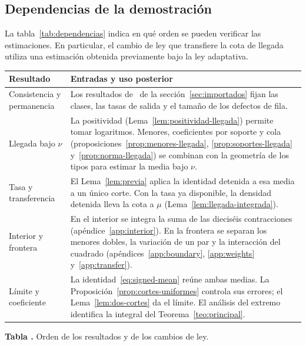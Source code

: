 \subsection{Dependencias de la demostración}\label{sec:dependencias}
La tabla~\ref{tab:dependencias} indica en qué orden se pueden verificar las estimaciones.
En particular, el cambio de ley que transfiere la cota de llegada utiliza una estimación
obtenida previamente bajo la ley adaptativa.
\begin{center}
\small
\begin{tabular}{@{}L{.30\linewidth}L{.63\linewidth}@{}}
\toprule Resultado & Entradas y uso posterior\\ \midrule
Consistencia y permanencia &
Los resultados de~\cite{pc,tc} de la sección~\ref{sec:importados} fijan las clases, las tasas
de salida y el tamaño de los defectos de fila.\\
Llegada bajo \(\nu\) &
La positividad (Lema~\ref{lem:positividad-llegada}) permite tomar logaritmos.
Menores, coeficientes por soporte y cola (proposiciones~\ref{prop:menores-llegada},
\ref{prop:soportes-llegada} y~\ref{prop:norma-llegada}) se combinan con la geometría de los
tipos para estimar la media bajo \(\nu\).\\
Tasa y transferencia &
El Lema~\ref{lem:previa} aplica la identidad detenida a esa media a un único corte.
Con la tasa ya disponible, la densidad detenida lleva la cota a \(\mu\)
(Lema~\ref{lem:llegada-integrada}).\\
Interior y frontera &
En el interior se integra la suma de las dieciséis contracciones
(apéndice~\ref{app:interior}). En la frontera se separan los menores dobles,
la variación de un par y la interacción del cuadrado
(apéndices~\ref{app:boundary}, \ref{app:weights} y~\ref{app:transfer}).\\
Límite y coeficiente &
La identidad~\eqref{eq:signed-mean} reúne ambas medias.
La Proposición~\ref{prop:cortes-uniformes} controla sus errores; el
Lema~\ref{lem:dos-cortes} da el límite. El análisis del extremo identifica la
integral del Teorema~\ref{teo:principal}.\\
\bottomrule
\end{tabular}
\label{tab:dependencias}\par\smallskip
\textbf{Tabla \thetable.} Orden de los resultados y de los cambios de ley.
\end{center}
